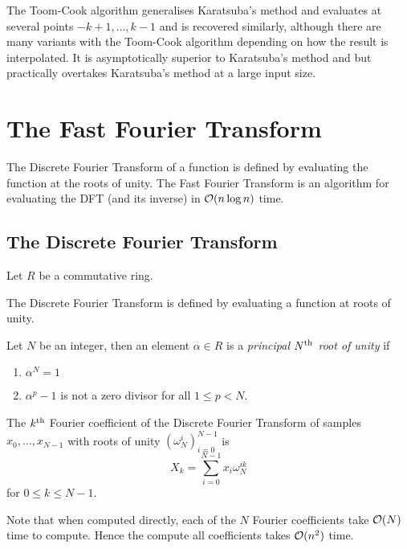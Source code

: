 The Toom-Cook algorithm generalises Karatsuba's method and evaluates at several points $-k + 1, \ldots, k - 1$ and is recovered similarly, although there are many variants with the Toom-Cook algorithm depending on how the result is interpolated. It is asymptotically superior to Karatsuba's method and but practically overtakes Karatsuba's method at a large input size.

\section{The Fast Fourier Transform}

The Discrete Fourier Transform of a function is defined by evaluating the function at the roots of unity. The Fast Fourier Transform is an algorithm for evaluating the DFT (and its inverse) in $\mathcal O(n \log n)$ time.

\subsection{The Discrete Fourier Transform}

Let $R$ be a commutative ring.

The Discrete Fourier Transform is defined by evaluating a function at roots of unity.

\begin{definition}
  Let $N$ be an integer, then an element $\alpha \in R$ is a \emph{principal $N^{\textrm{th}}$ root of unity} if
  \begin{enumerate}
    \item $\alpha^N = 1$
    \item $\alpha^p - 1$ is not a zero divisor for all $1 \leq p < N$.
  \end{enumerate}
\end{definition}


\begin{definition}
    The $k^{\textrm{th}}$ Fourier coefficient of the Discrete Fourier Transform of samples $x_0, \ldots, x_{N-1}$ with roots of unity $(\omega_N^i)_{i=0}^{N-1}$ is
\[
    X_k = \sum^{N-1}_{i=0}x_i\omega_{N}^{ik}
\]
for $0 \leq k \leq N-1$.
\end{definition}

Note that when computed directly, each of the $N$ Fourier coefficients take $\mathcal O(N)$ time to compute. Hence the compute all coefficients takes $\mathcal O(n^2)$ time.


